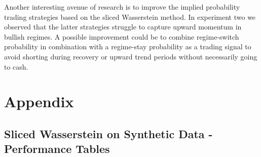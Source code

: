\documentclass[12pt,a4paper]{report}
\begin{document}
Another interesting avenue of research is to improve the implied probability trading strategies based on the sliced Wasserstein method.
In experiment two we observed that the latter strategies struggle to capture upward momentum in bullish regimes.
A possible improvement could be to combine regime-switch probability in combination with a regime-stay probability as a trading signal to avoid shorting during recovery or upward trend periods without necessarily going to cash.



\newpage
{}



\newpage
\appendix
\chapter*{Appendix}
\label{sec:appendix}

\section{Sliced Wasserstein on Synthetic Data - Performance Tables}
\end{document}
